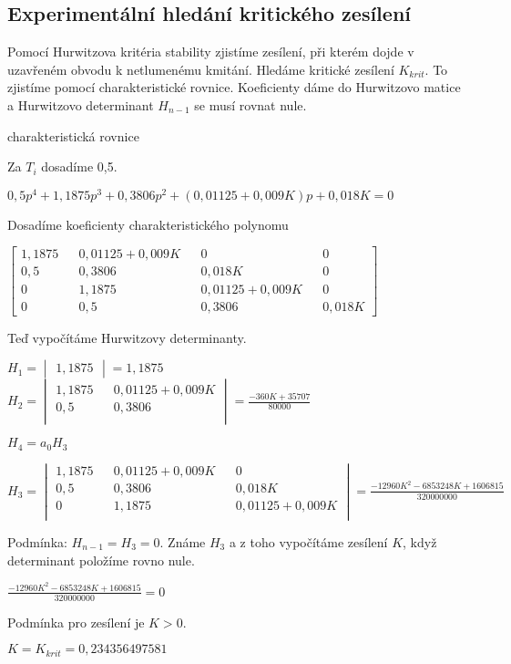 \documentclass{article}
\begin{document}
		\subsection{Experimentální hledání kritického zesílení}
			Pomocí Hurwitzova kritéria stability zjistíme zesílení, při kterém dojde v uzavřeném obvodu k netlumenému kmitání. Hledáme kritické zesílení $K_{krit}$. To zjistíme pomocí charakteristické rovnice. Koeficienty dáme do Hurwitzovo matice a Hurwitzovo determinant $H_{n-1}$ se musí rovnat nule.
			\begin{center}
			charakteristická rovnice

			Za $T_i$ dosadíme 0,5.

			\bigskip

			$0,5p^4+1,1875p^3+0,3806p^2+(0,01125+0,009K)p+0,018K=0$


			\bigskip

			Dosadíme koeficienty charakteristického polynomu

			\bigskip

			$\begin{bmatrix}
			1,1875 && 0,01125+0,009K && 0 && 0 \\
			0,5 && 0,3806 && 0,018K && 0 \\
			0 && 1,1875 && 0,01125+0,009K && 0 \\
			0 && 0,5 && 0,3806 && 0,018K
			\end{bmatrix}$

			\bigskip

			Teď vypočítáme Hurwitzovy determinanty.

			\bigskip
			$H_1=\begin{vmatrix}
			1,1875
			\end{vmatrix}=1,1875$
			\bigskip
			$H_2=\begin{vmatrix}
			1,1875 && 0,01125+0,009K\\
			0,5 && 0,3806 \\
			\end{vmatrix}=\frac{-360K+35707}{80000}$

			\bigskip

			$H_4=a_0H_3$

			\bigskip

			$H_3=\begin{vmatrix}
			1,1875 && 0,01125+0,009K && 0\\
			0,5 && 0,3806 && 0,018K\\
			0 && 1,1875 && 0,01125+0,009K \\
			\end{vmatrix}=\frac{-12960K^2-6853248K+1606815}{320000000}$

			\bigskip
			 Podmínka: $H_{n-1}=H_3=0$. Známe $H_3$ a z toho vypočítáme zesílení $K$, když determinant položíme rovno nule.

			 \bigskip

			 $\frac{-12960K^2-6853248K+1606815}{320000000}=0$

			 \bigskip

			 Podmínka pro zesílení je $K > 0$.

			 \bigskip

			 $K=K_{krit}=0,234356497581$
			\end{center}
\end{document}
